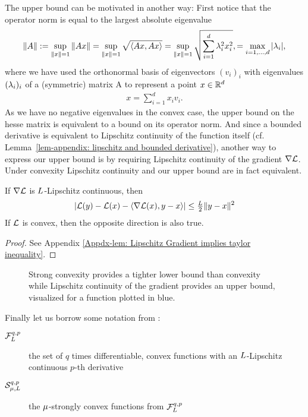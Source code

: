 The upper bound can be motivated in another way: First notice that
the operator norm is equal to the largest absolute eigenvalue
\begin{align*}
	\|A\| := \sup_{\|x\| =1} \|Ax\|
	= \sup_{\|x\| =1} \sqrt{\langle Ax, Ax\rangle}
	= \sup_{\|x\| =1} \sqrt{\sum_{i=1}^\dimension \hesseEV_i^2 x_i^2},
	= \max_{i=1,\dots,\dimension} |\hesseEV_i|,
\end{align*}
where we have used the orthonormal basis of eigenvectors \((v_i)_i\) with
eigenvalues \((\hesseEV_i)_i\) of a (symmetric) matrix A to represent a point
\(x\in\reals^\dimension\)
\begin{align*}
	x = \sum_{i=1}^{d}x_i v_i.
\end{align*}
As we have no negative eigenvalues in the convex case, the upper bound on the
hesse matrix is equivalent to a bound on its operator norm. And since a
bounded derivative is equivalent to Lipschitz continuity of the function itself
(cf. Lemma~\ref{lem-appendix: lipschitz and bounded derivative}), another way
to express our upper bound is by requiring Lipschitz continuity of the gradient
\(\nabla \Loss\). Under convexity Lipschitz continuity and our upper bound are
in fact equivalent.
%
\begin{lemma}
	\label{lem: Lipschitz Gradient implies taylor inequality}
	If \(\nabla \Loss\) is \(\ubound\)-Lipschitz continuous, then
	\begin{align*}
		| \Loss(y) - \Loss(x) - \langle \nabla \Loss(x), y-x\rangle |
		\le \tfrac{\ubound}2 \|y-x\|^2
	\end{align*}
	If \(\Loss\) is convex, then the opposite direction is also true.
\end{lemma}
\begin{proof}
	See Appendix \ref{Appdx-lem: Lipschitz Gradient implies taylor inequality}.
\end{proof}
%
\begin{figure}[h]
	\centering
	\def\svgwidth{1\textwidth}
	
	\caption{
		Strong convexity provides a tighter lower bound than convexity
		while Lipschitz continuity of the gradient provides an upper bound, visualized
		for a function plotted in blue.
	}
	\label{fig: visualize strong convexity}
\end{figure}
%
\begin{definition}
	Finally let us borrow some notation from \citeauthor{nesterovLecturesConvexOptimization2018}:
	\begin{description}
		\item[{\(\lipGradientSet[q,p]{\ubound}\)}] the set of \(q\) times
		differentiable, convex functions with an \(\ubound\)-Lipschitz continuous
		\(p\)-th derivative
		\item[{\(\strongConvex[q,p]{\lbound}{\ubound}\)}] the \(\lbound\)-strongly convex
		functions from \(\lipGradientSet[q,p]{\ubound}\)
	\end{description}
\end{definition}

